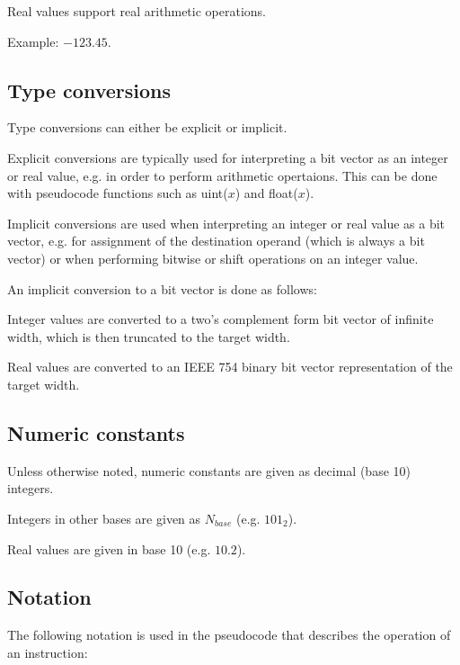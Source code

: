 Real values support real arithmetic operations.

Example: $-123.45$.

\subsection{Type conversions}

Type conversions can either be explicit or implicit.

Explicit conversions are typically used for interpreting a bit vector as an
integer or real value, e.g. in order to perform arithmetic opertaions. This can
be done with pseudocode functions such as uint($x$) and float($x$).

Implicit conversions are used when interpreting an integer or real value as a
bit vector, e.g. for assignment of the destination operand (which is always a
bit vector) or when performing bitwise or shift operations on an integer value.

An implicit conversion to a bit vector is done as follows:

\begin{bulletitems}
  \item Integer values are converted to a two's complement form bit vector of
        infinite width, which is then truncated to the target width.
  \item Real values are converted to an IEEE 754 binary bit vector
        representation of the target width.
\end{bulletitems}

\subsection{Numeric constants}

Unless otherwise noted, numeric constants are given as decimal (base 10)
integers.

Integers in other bases are given as $N_{base}$ (e.g. $101_{2}$).

Real values are given in base 10 (e.g. $10.2$).

\subsection{Notation}

The following notation is used in the pseudocode that describes the operation
of an instruction:

